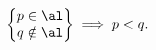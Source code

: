 \begin{lem}
	\label{1.19:lem1}
	\[ \left\{
		\begin{matrix}
			p \in \al \\
			q \notin \al
		\end{matrix}
		\right\}\implies p < q.\]
\end{lem}
